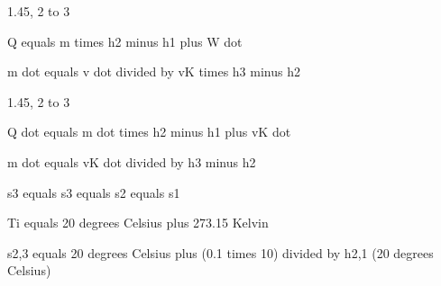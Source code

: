 1.45, 2 to 3

Q equals m times h2 minus h1 plus W dot

m dot equals v dot divided by vK times h3 minus h2

1.45, 2 to 3

Q dot equals m dot times h2 minus h1 plus vK dot

m dot equals vK dot divided by h3 minus h2

s3 equals s3 equals s2 equals s1

Ti equals 20 degrees Celsius plus 273.15 Kelvin

s2,3 equals 20 degrees Celsius plus (0.1 times 10) divided by h2,1 (20 degrees Celsius)